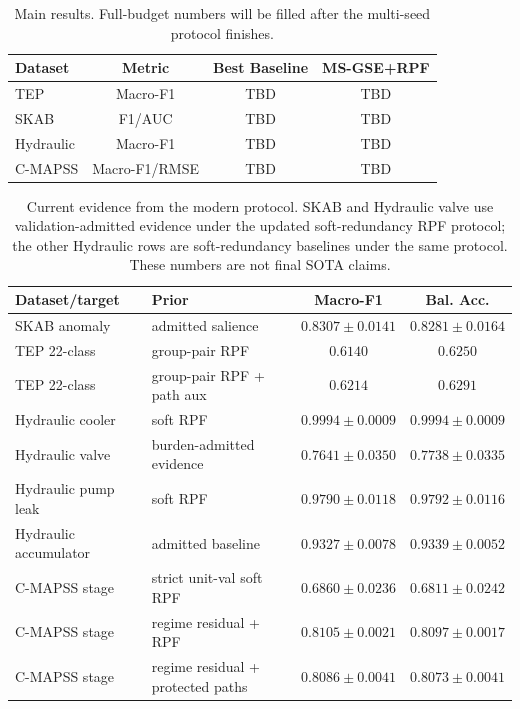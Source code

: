 \documentclass[letterpaper]{article}
\begin{document}
\begin{table}[t]
\centering
\caption{Main results. Full-budget numbers will be filled after the multi-seed protocol finishes.}
\begin{tabular}{lccc}
\toprule
Dataset & Metric & Best Baseline & MS-GSE+RPF \\
\midrule
TEP & Macro-F1 & TBD & TBD \\
SKAB & F1/AUC & TBD & TBD \\
Hydraulic & Macro-F1 & TBD & TBD \\
C-MAPSS & Macro-F1/RMSE & TBD & TBD \\
\bottomrule
\end{tabular}
\end{table}

\begin{table}[t]
\centering
\caption{Current evidence from the modern protocol. SKAB and Hydraulic valve use validation-admitted evidence under the updated soft-redundancy RPF protocol; the other Hydraulic rows are soft-redundancy baselines under the same protocol. These numbers are not final SOTA claims.}
\begin{tabular}{llcc}
\toprule
Dataset/target & Prior & Macro-F1 & Bal. Acc. \\
\midrule
SKAB anomaly & admitted salience & \(0.8307{\pm}0.0141\) & \(0.8281{\pm}0.0164\) \\
TEP 22-class & group-pair RPF & \(0.6140\) & \(0.6250\) \\
TEP 22-class & group-pair RPF + path aux & \(0.6214\) & \(0.6291\) \\
Hydraulic cooler & soft RPF & \(0.9994{\pm}0.0009\) & \(0.9994{\pm}0.0009\) \\
Hydraulic valve & burden-admitted evidence & \(0.7641{\pm}0.0350\) & \(0.7738{\pm}0.0335\) \\
Hydraulic pump leak & soft RPF & \(0.9790{\pm}0.0118\) & \(0.9792{\pm}0.0116\) \\
Hydraulic accumulator & admitted baseline & \(0.9327{\pm}0.0078\) & \(0.9339{\pm}0.0052\) \\
C-MAPSS stage & strict unit-val soft RPF & \(0.6860{\pm}0.0236\) & \(0.6811{\pm}0.0242\) \\
C-MAPSS stage & regime residual + RPF & \(0.8105{\pm}0.0021\) & \(0.8097{\pm}0.0017\) \\
C-MAPSS stage & regime residual + protected paths & \(0.8086{\pm}0.0041\) & \(0.8073{\pm}0.0041\) \\
\bottomrule
\end{tabular}
\end{table}
\end{document}
